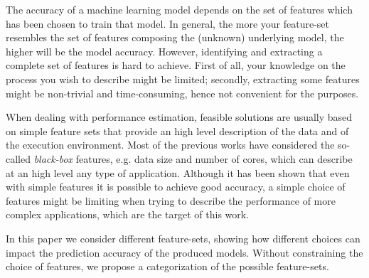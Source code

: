 \documentclass[a4paper, 10pt, conference]{ieeeconf}      %
\begin{document}
The accuracy of a machine learning model depends on the set of features which has been chosen to train that model. In general, the more your feature-set resembles the set of features composing the (unknown) underlying model, the higher will be the model accuracy. 
However, identifying and extracting a complete set of features is hard to achieve. First of all, your knowledge on the process you wish to describe might be limited; secondly, extracting some features might be non-trivial and time-consuming, hence not convenient for the purposes. 

When dealing with performance estimation, feasible solutions are usually based on simple feature sets that provide an high level description of the data and of the execution environment. 
Most of the previous works have considered the so-called \textit{black-box} features, e.g. data size and number of cores, which can describe at an high level any type of application.
Although it has been shown that even with simple features it is possible to achieve good accuracy, a simple choice of features might be limiting when trying to describe the performance of more complex applications, which are the target of this work.

In this paper we consider different feature-sets, showing how different choices can impact the prediction accuracy of the produced models. Without constraining the choice of features, we propose a categorization of the possible feature-sets.
\end{document}
